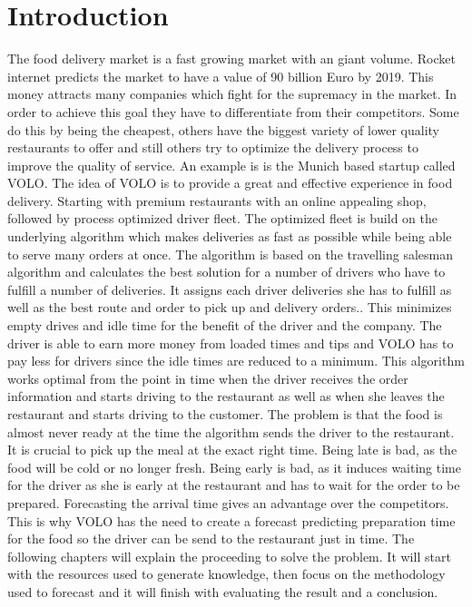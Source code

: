 \chapter{Introduction}\label{chapter:Introduction}

\renewcommand{\thepage}{\arabic{page}}
\setcounter{page}{1}

The food delivery market is a fast growing market with an giant volume. Rocket internet predicts the market to have a value of 90 billion Euro by 2019. This money attracts many companies which fight for the supremacy in the market. In order to achieve this goal they have to differentiate from their competitors. Some do this by being the cheapest, others have the biggest variety of lower quality restaurants to offer and still others try to optimize the delivery process to improve the quality of service.\newline
An example is is the Munich based startup called VOLO. The idea of VOLO is to provide a great and effective experience in food delivery. Starting with premium restaurants with an online appealing shop, followed by process optimized driver fleet. The optimized fleet is build on the underlying algorithm which makes deliveries as fast as possible while being able to serve many orders at once. The algorithm is based on the travelling salesman algorithm and calculates the best solution for a number of drivers who have to fulfill a number of deliveries. It assigns each driver deliveries she has to fulfill as well as the best route and order to pick up and delivery orders.. This minimizes empty drives and idle time for the benefit of the driver and the company. The driver is able to earn more money from loaded times and tips and VOLO has to pay less for drivers since the idle times are reduced to a minimum.\newline
This algorithm works optimal from the point in time when the driver receives the order information and starts driving to the restaurant as well as when she leaves the restaurant and starts driving to the customer. The problem is that the food is almost never ready at the time the algorithm sends the driver to the restaurant. It is crucial to pick up the meal at the exact right time. Being late is bad, as the food will be cold or no longer fresh. Being early is bad, as it induces waiting time for the driver as she is early at the restaurant and has to wait for the order to be prepared. Forecasting the arrival time gives an advantage over the competitors.\newline
This is why VOLO has the need to create a forecast predicting preparation time for the food so the driver can be send to the restaurant just in time.\newline\newline
The following chapters will explain the proceeding to solve the problem. It will start with the resources used to generate knowledge, then focus on the methodology used to forecast and it will finish with evaluating the result and a conclusion.
